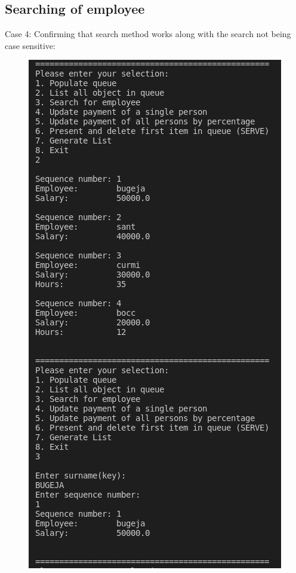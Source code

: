 \documentclass[12pt]{article}
\begin{document}
\subsection{Searching of employee}
Case 4: Confirming that search method works along with the search not being case sensitive:
\bigskip
\begin{figure}[h]
\centering
\includegraphics[scale=0.40]{Images/Testing 3/1.png}
\end{figure}
\end{document}

